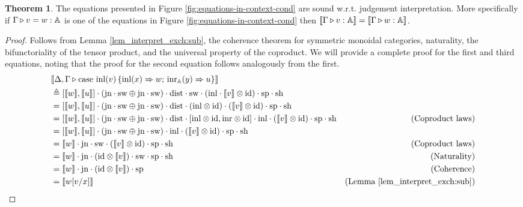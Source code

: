 \documentclass[10pt,a4paper]{amsart}
\theoremstyle{definition}
\theoremstyle{definition}
\theoremstyle{definition}
\theoremstyle{definition}
\theoremstyle{definition}
\theoremstyle{definition}
\newtheorem{theorem}[definition]{Theorem}
\begin{document}
\begin{theorem} \label {theorem:eq_in_context}
  The equations presented in Figure \ref{fig:equations-in-context-cond} are sound w.r.t. judgement interpretation. More specifically if $ \Gamma \triangleright v = w: \mathbb{A}$ is one of the equations in Figure \ref{fig:equations-in-context-cond} then $[\![ \Gamma \triangleright v: \mathbb{A} ]\!] = [\![ \Gamma \triangleright w: \mathbb{A} ]\!]$.
\end{theorem}


\begin{proof}
  Follows from Lemma \autoref{lem_interpret_exch:sub}, the coherence theorem for symmetric monoidal categories, naturality,  the bifunctoriality of the tensor product, and the universal property of the coproduct.   
  We will provide a complete proof for the first and third equations, noting that the proof for the second equation follows analogously from the first.
  \begin{align*}
    &\llbracket \Delta,\Gamma \triangleright  \text{case }  \text{inl}(v)\, \{\text{inl} (x) \Rightarrow w ;\, \text{inr}_{\mathbb{A}} (y) \Rightarrow u\} \rrbracket \\
    & \triangleq  [\llbracket w\rrbracket,\llbracket u \rrbracket] \cdot (\text{jn} \cdot \mathrm{sw} \oplus \text{jn} \cdot \mathrm{sw}  ) \cdot \mathrm{dist} \cdot \mathrm{sw} \cdot (\mathrm{inl} \cdot \llbracket  v \rrbracket \otimes \text{id}) \cdot \text{sp} \cdot \text{sh} \\
    & =  [\llbracket w\rrbracket,\llbracket u \rrbracket] \cdot (\text{jn} \cdot \mathrm{sw} \oplus \text{jn} \cdot \mathrm{sw} ) \cdot \mathrm{dist} \cdot (\mathrm{inl} \otimes \text{id}  ) \cdot ( \llbracket  v \rrbracket \otimes \text{id}) \cdot \text{sp} \cdot \text{sh}  \\
    & =  [\llbracket w\rrbracket,\llbracket u \rrbracket] \cdot (\text{jn} \cdot \mathrm{sw} \oplus \text{jn} \cdot \mathrm{sw} ) \cdot \mathrm{dist} \cdot [\mathrm{inl} \otimes \mathrm{id}, \mathrm{inr} \otimes \mathrm{id}] \cdot \mathrm{inl}  \cdot ( \llbracket  v \rrbracket \otimes \text{id}) \cdot \text{sp} \cdot \text{sh}  &(\text{Coproduct laws})\\
    & =  [\llbracket w\rrbracket,\llbracket u \rrbracket] \cdot (\text{jn} \cdot \mathrm{sw} \oplus \text{jn} \cdot \mathrm{sw} )  \cdot \mathrm{inl}  \cdot ( \llbracket  v \rrbracket \otimes \text{id}) \cdot \text{sp} \cdot \text{sh} \\
    & = \llbracket  w \rrbracket\cdot \text{jn} \cdot   \mathrm{sw} \cdot(\llbracket v \rrbracket \otimes  \text{id}) \cdot \text{sp} \cdot \text{sh} & {\text{(Coproduct laws)}} \\
    &=  \llbracket  w \rrbracket\cdot \text{jn} \cdot(  \text{id}\otimes \llbracket v \rrbracket ) \cdot   \mathrm{sw} \cdot \text{sp} \cdot \text{sh} & {\text{(Naturality)}} \\
    &= \llbracket w \rrbracket \cdot \text{jn} \cdot( \text{id} \otimes \llbracket v \rrbracket) \cdot \text{sp} & {\text{(Coherence)}}\\
    & = \llbracket w[v/x]  \rrbracket  & {\text{(Lemma \ref{lem_interpret_exch:sub})}}
\end{align*}


\end{proof}
\end{document}
